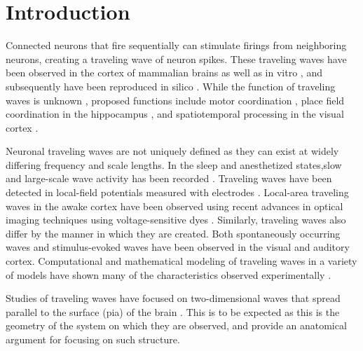 \documentclass[12pt]{article}
\begin{document}

\section{Introduction} 
Connected neurons that fire sequentially can stimulate firings from neighboring neurons, creating a traveling wave of neuron spikes. 
These traveling waves have been observed in the cortex of mammalian brains \parencite{Muller2018}\parencite{reimer2010}  as well as in vitro \parencite{wu2008}\parencite{huang2004}\parencite{Golomb1999}, and subsequently have been reproduced in silico \parencite{keane2015}\parencite{Senk2020}\color{red}\parencite{Golomb1996}\parencite{ermentrout2001}\color{black}. 
While the function of traveling waves is unknown \parencite{wu2008}\parencite{Muller2018}, proposed functions include motor coordination \color{red}\parencite{Rubino2006} \color{black} , place field coordination in the hippocampus \parencite{lubernov2009}, and spatiotemporal processing in the visual cortex \parencite{wu2008}\parencite{Muller2014}.

Neuronal traveling waves are not uniquely defined as they can exist at widely differing frequency and scale lengths.  
In the sleep and anesthetized states,slow and large-scale wave activity has been recorded \parencite{Muller2018}. 
\color{red}Traveling waves have been detected in local-field potentials measured with electrodes \parencite{Rubino2006}\parencite{sanes1993}\parencite{Riehle2013}\color{black}.
Local-area traveling waves in the awake cortex have been observed using recent advances in optical imaging techniques using voltage-sensitive dyes \parencite{wu2008}\parencite{Shoham1999}\color{red}\parencite{Xu2007}\parencite{Ferezou2006}\color{black}.  
Similarly, traveling waves also differ by the manner in which they are created. 
Both spontaneously occurring waves and stimulus-evoked \parencite{reimer2010} waves have been observed in the visual and auditory cortex. 
Computational and mathematical modeling of traveling waves in a variety of models have shown many of the characteristics observed experimentally \parencite{ermentrout2001}\parencite{keane2015}\parencite{gibson2009}.

Studies of traveling waves have focused on two-dimensional waves that spread parallel to the surface (pia) of the brain \parencite{reimer2010}\parencite{keane2015}\color{red}\parencite{Townsend2018}\parencite{Golomb1997}\parencite{Qi2015}\color{black}. 
This is to be expected as this is the geometry of the system on which they are observed, and \color{red}\parencite{Wilson1973} provide an anatomical argument for focusing on such structure\color{black}. 
\end{document}
